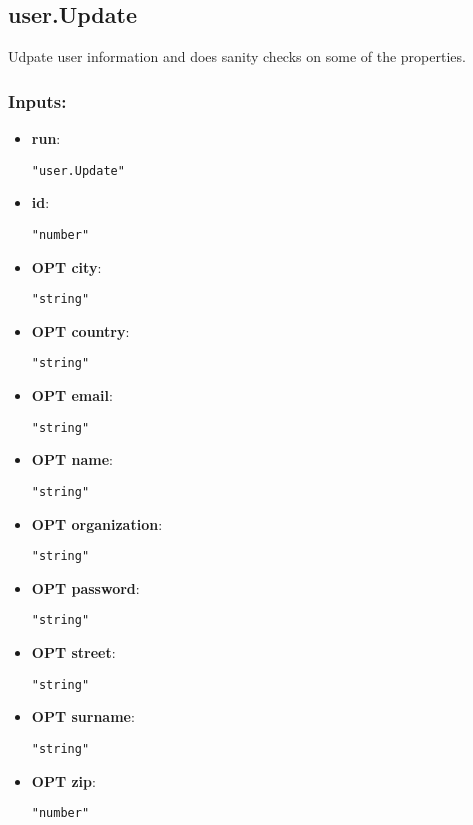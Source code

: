 \subsection{user.Update}
Udpate user information and does sanity checks on some of the properties.
\subsubsection*{Inputs:}
\begin{itemize}
    \item \textbf{run}: 
\begin{lstlisting}
"user.Update"
\end{lstlisting}
    \item \textbf{id}: 
\begin{lstlisting}
"number"
\end{lstlisting}
    \item \textbf{OPT city}: 
\begin{lstlisting}
"string"
\end{lstlisting}
    \item \textbf{OPT country}: 
\begin{lstlisting}
"string"
\end{lstlisting}
    \item \textbf{OPT email}: 
\begin{lstlisting}
"string"
\end{lstlisting}
    \item \textbf{OPT name}: 
\begin{lstlisting}
"string"
\end{lstlisting}
    \item \textbf{OPT organization}: 
\begin{lstlisting}
"string"
\end{lstlisting}
    \item \textbf{OPT password}: 
\begin{lstlisting}
"string"
\end{lstlisting}
    \item \textbf{OPT street}: 
\begin{lstlisting}
"string"
\end{lstlisting}
    \item \textbf{OPT surname}: 
\begin{lstlisting}
"string"
\end{lstlisting}
    \item \textbf{OPT zip}: 
\begin{lstlisting}
"number"
\end{lstlisting}
  \end{itemize}

